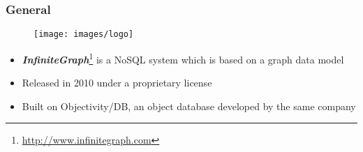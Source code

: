 
\begin{frame}
\frametitle{General}
\begin{figure}[htb]
 	\centering
  	\texttt{[image: images/logo]}
\end{figure}
\begin{itemize}
	\item \emph{\textbf{InfiniteGraph}}\footnote{\url{http://www.infinitegraph.com}} is a NoSQL system which is based on a graph data model
	\item Released in 2010 under a proprietary license
	\item Built on Objectivity/DB, an object database developed by the same company
\end{itemize}
\end{frame} 